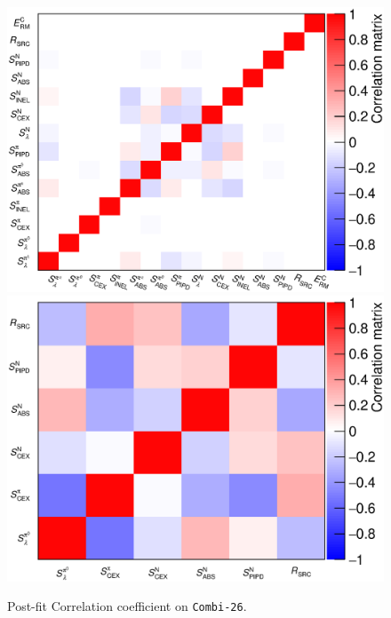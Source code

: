 
\begin{figure}[!htb] 	
    \centering 		

    \includegraphics[width=\dbfigwid\textwidth]{figures/tuning/result_test_comb_26_cor_allpar_covfix.eps}
    \includegraphics[width=\dbfigwid\textwidth]{figures/tuning/result_test_comb_26_cor_redpar_covfix.eps}
    \caption{ Post-fit Correlation coefficient on \texttt{Combi-26}. } 
\end{figure}

